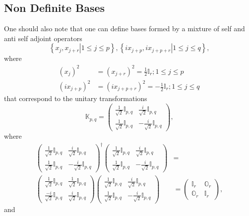 \documentclass[aps, preprint]{revtex4}
\begin{document}
\subsection{Non Definite Bases}
One should also note that one can define bases formed by a mixture of self and anti self adjoint operators
\begin{equation}\left \{\left .x_{j} ,x_{j +r}\right \vert 1 \leq j \leq p\right \} ,\left \{\left .i x_{j +p} ,i x_{j +p +r}\right \vert 1 \leq j \leq q\right \}\text{,}
\end{equation}where
\begin{align}\left (x_{j}\right )^{2} &  =\left (x_{j +r}\right )^{2} =\frac{1}{2} \mathbb{I}_{r} ;1 \leq j \leq p \\
\left (i x_{j +p}\right )^{2} &  =\left (i x_{j +p +r}\right )^{2} = -\frac{1}{2} \mathbb{I}_{r} ;1 \leq j \leq q\end{align}that correspond to the unitary transformations
\begin{equation}\mathbb{K}_{p ,q} =\left (\begin{array}{cc}\frac{1}{\sqrt{2}} \mathbb{I}_{p ,q} & \frac{i}{\sqrt{2}} \mathbb{I}_{p ,q} \\
\frac{1}{\sqrt{2}} \mathbb{I}_{p ,q} &  -\frac{i}{\sqrt{2}} \mathbb{I}_{p ,q}\end{array}\right )\text{,}
\end{equation}where
\begin{align}\left (\begin{array}{cc}\frac{1}{\sqrt{2}} \mathbb{I}_{p ,q} & \frac{i}{\sqrt{2}} \mathbb{I}_{p ,q} \\
\frac{1}{\sqrt{2}} \mathbb{I}_{p ,q} &  -\frac{i}{\sqrt{2}} \mathbb{I}_{p ,q}\end{array}\right )^{ \dag } \left (\begin{array}{cc}\frac{1}{\sqrt{2}} \mathbb{I}_{p ,q} & \frac{i}{\sqrt{2}} \mathbb{I}_{p ,q} \\
\frac{1}{\sqrt{2}} \mathbb{I}_{p ,q} &  -\frac{i}{\sqrt{2}} \mathbb{I}_{p ,q}\end{array}\right ) &  = \\
\left (\begin{array}{cc}\frac{1}{\sqrt{2}} \mathbb{I}_{p ,q} & \frac{1}{\sqrt{2}} \mathbb{I}_{p ,q} \\
\frac{ -i}{\sqrt{2}} \mathbb{I}_{p ,q} & \frac{i}{\sqrt{2}} \mathbb{I}_{p ,q}\end{array}\right ) \left (\begin{array}{cc}\frac{1}{\sqrt{2}} \mathbb{I}_{p ,q} & \frac{i}{\sqrt{2}} \mathbb{I}_{p ,q} \\
\frac{1}{\sqrt{2}} \mathbb{I}_{p ,q} &  -\frac{i}{\sqrt{2}} \mathbb{I}_{p ,q}\end{array}\right ) &  =\left (\begin{array}{cc}\mathbb{I}_{r} & \mathbb{O}_{r} \\
\mathbb{O}_{r} & \mathbb{I}_{r}\end{array}\right )\text{,}\end{align}and
\end{document}
